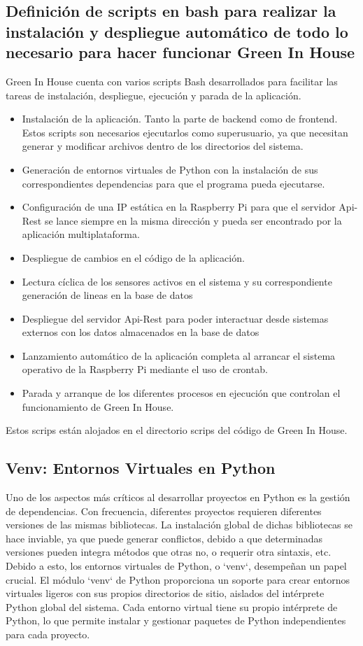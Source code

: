     \subsection{Definición de scripts en bash para realizar la instalación y despliegue automático de todo lo necesario para hacer funcionar Green In House}
    Green In House cuenta con varios scripts Bash desarrollados para facilitar las tareas de instalación, despliegue, ejecución y parada de la aplicación.
    \begin{itemize}    
        \item Instalación de la aplicación. Tanto la parte de backend como de frontend. Estos scripts son necesarios ejecutarlos como superusuario, ya que necesitan generar y modificar archivos dentro de los directorios del sistema.    
        \item Generación de entornos virtuales de Python con la instalación de sus correspondientes dependencias para que el programa pueda ejecutarse.    
        \item Configuración de una IP estática en la Raspberry Pi para que el servidor Api-Rest se lance siempre en la misma dirección y pueda ser encontrado por la aplicación multiplataforma.    
        \item Despliegue de cambios en el código de la aplicación.    
        \item Lectura cíclica de los sensores activos en el sistema y su correspondiente generación de lineas en la base de datos    
        \item Despliegue del servidor Api-Rest para poder interactuar desde sistemas externos con los datos almacenados en la base de datos    
        \item Lanzamiento automático de la aplicación completa al arrancar el sistema operativo de la Raspberry Pi mediante el uso de crontab.    
        \item Parada y arranque de los diferentes procesos en ejecución que controlan el funcionamiento de Green In House.    
    \end{itemize} 
    Estos scrips están alojados en el directorio scrips del código de Green In House.

    \subsection{Venv: Entornos Virtuales en Python}
    Uno de los aspectos más críticos al desarrollar proyectos en Python es la gestión de dependencias. Con frecuencia, diferentes proyectos requieren diferentes versiones de las mismas bibliotecas. La instalación global de dichas bibliotecas se hace inviable, ya que puede generar conflictos, debido a que determinadas versiones pueden integra métodos que otras no, o requerir otra sintaxis, etc. Debido a esto, los entornos virtuales de Python, o `venv`, desempeñan un papel crucial.
    El módulo `venv` de Python proporciona un soporte para crear entornos virtuales ligeros con sus propios directorios de sitio, aislados del intérprete Python global del sistema. Cada entorno virtual tiene su propio intérprete de Python, lo que permite instalar y gestionar paquetes de Python independientes para cada proyecto.
